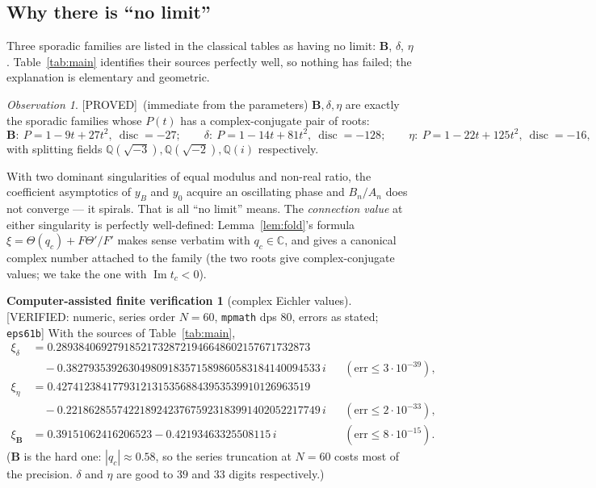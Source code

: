 \documentclass[11pt,reqno]{amsart}
\theoremstyle{plain}
\theoremstyle{definition}
\newtheorem{verification}[theorem]{Computer-assisted finite verification}
\theoremstyle{remark}
\newtheorem{observation}[theorem]{Observation}
\newcommand{\Q}{\mathbb{Q}}
\newcommand{\C}{\mathbb{C}}
\newcommand{\Proved}{\textup{\textsf{[PROVED]}}}
\newcommand{\VerifiedR}[1]{\textup{\textsf{[VERIFIED: #1]}}}
\begin{document}
\subsection{Why there is ``no limit''}
Three sporadic families are listed in the classical tables as having no
limit: $\mathbf B$, $\delta$, $\eta$. Table~\ref{tab:main} identifies their
sources perfectly well, so nothing has failed; the explanation is
elementary and geometric.

\begin{observation}\label{obs:complex}
\Proved\ (immediate from the parameters)
$\mathbf B,\delta,\eta$ are exactly the sporadic families whose $P(t)$ has
a complex-conjugate pair of roots:
\[
\mathbf B:\ P=1-9t+27t^2,\ \operatorname{disc}=-27;\qquad
\delta:\ P=1-14t+81t^2,\ \operatorname{disc}=-128;\qquad
\eta:\ P=1-22t+125t^2,\ \operatorname{disc}=-16 ,
\]
with splitting fields $\Q(\sqrt{-3}),\Q(\sqrt{-2}),\Q(i)$ respectively.
\end{observation}

With two dominant singularities of equal modulus and non-real ratio, the
coefficient asymptotics of $y_B$ and $y_0$ acquire an oscillating phase and
$B_n/A_n$ does not converge --- it spirals. That is all ``no limit'' means.
The \emph{connection value} at either singularity is perfectly
well-defined: Lemma~\ref{lem:fold}'s formula
$\xi=\Theta(q_c)+F\Theta'/F'$ makes sense verbatim with $q_c\in\C$, and
gives a canonical complex number attached to the family (the two roots give
complex-conjugate values; we take the one with $\operatorname{Im}t_c<0$).

\begin{verification}[complex Eichler values]\label{ver:complex}
\VerifiedR{numeric, series order $N=60$, \texttt{mpmath} dps $80$, errors
as stated; \texttt{eps61b}}
With the sources of Table~\ref{tab:main},
\begin{align*}
\xi_\delta &= 0.289384069279185217328721946648602157671732873\\
           &\quad -0.382793539263049809183571589860583184140094533\,i
           &&(\text{err}\le3\cdot10^{-39}),\\[2pt]
\xi_\eta   &= 0.427412384177931213153568843953539910126963519\\
           &\quad -0.221862855742218924237675923183991402052217749\,i
           &&(\text{err}\le2\cdot10^{-33}),\\[2pt]
\xi_{\mathbf B} &= 0.39151062416206523-0.42193463325508115\,i
           &&(\text{err}\le8\cdot10^{-15}).
\end{align*}
($\mathbf B$ is the hard one: $|q_c|\approx0.58$, so the series truncation
at $N=60$ costs most of the precision. $\delta$ and $\eta$ are good to $39$
and $33$ digits respectively.)
\end{verification}
\end{document}
